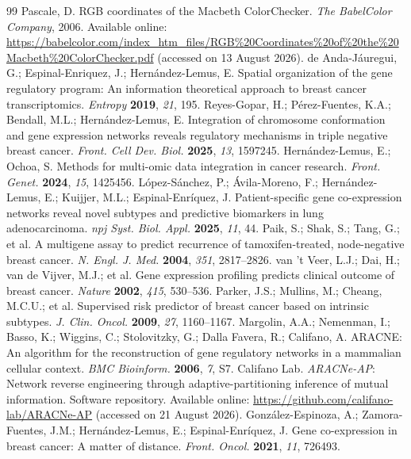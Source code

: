 \documentclass[11pt]{article}
\begin{document}
\begin{thebibliography}{99}
Pascale, D. RGB coordinates of the Macbeth ColorChecker. \textit{The BabelColor Company}, 2006. Available online: \url{https://babelcolor.com/index_htm_files/RGB\%20Coordinates\%20of\%20the\%20Macbeth\%20ColorChecker.pdf} (accessed on 13 August 2026).
de Anda-J\'{a}uregui, G.; Espinal-Enriquez, J.; Hern\'{a}ndez-Lemus, E. Spatial organization of the gene regulatory program: An information theoretical approach to breast cancer transcriptomics. \textit{Entropy} \textbf{2019}, \textit{21}, 195.
Reyes-Gopar, H.; P\'{e}rez-Fuentes, K.A.; Bendall, M.L.; Hern\'{a}ndez-Lemus, E. Integration of chromosome conformation and gene expression networks reveals regulatory mechanisms in triple negative breast cancer. \textit{Front. Cell Dev. Biol.} \textbf{2025}, \textit{13}, 1597245.
Hern\'{a}ndez-Lemus, E.; Ochoa, S. Methods for multi-omic data integration in cancer research. \textit{Front. Genet.} \textbf{2024}, \textit{15}, 1425456.
L\'{o}pez-S\'{a}nchez, P.; \'{A}vila-Moreno, F.; Hern\'{a}ndez-Lemus, E.; Kuijjer, M.L.; Espinal-Enr\'{i}quez, J. Patient-specific gene co-expression networks reveal novel subtypes and predictive biomarkers in lung adenocarcinoma. \textit{npj Syst. Biol. Appl.} \textbf{2025}, \textit{11}, 44.
Paik, S.; Shak, S.; Tang, G.; et al. A multigene assay to predict recurrence of tamoxifen-treated, node-negative breast cancer. \textit{N. Engl. J. Med.} \textbf{2004}, \textit{351}, 2817--2826.
van 't Veer, L.J.; Dai, H.; van de Vijver, M.J.; et al. Gene expression profiling predicts clinical outcome of breast cancer. \textit{Nature} \textbf{2002}, \textit{415}, 530--536.
Parker, J.S.; Mullins, M.; Cheang, M.C.U.; et al. Supervised risk predictor of breast cancer based on intrinsic subtypes. \textit{J. Clin. Oncol.} \textbf{2009}, \textit{27}, 1160--1167.
Margolin, A.A.; Nemenman, I.; Basso, K.; Wiggins, C.; Stolovitzky, G.; Dalla Favera, R.; Califano, A. ARACNE: An algorithm for the reconstruction of gene regulatory networks in a mammalian cellular context. \textit{BMC Bioinform.} \textbf{2006}, \textit{7}, S7.
Califano Lab. \textit{ARACNe-AP}: Network reverse engineering through adaptive-partitioning inference of mutual information. Software repository. Available online: \url{https://github.com/califano-lab/ARACNe-AP} (accessed on 21 August 2026).
Gonz\'{a}lez-Espinoza, A.; Zamora-Fuentes, J.M.; Hern\'{a}ndez-Lemus, E.; Espinal-Enr\'{i}quez, J. Gene co-expression in breast cancer: A matter of distance. \textit{Front. Oncol.} \textbf{2021}, \textit{11}, 726493.

\end{thebibliography}
\end{document}
